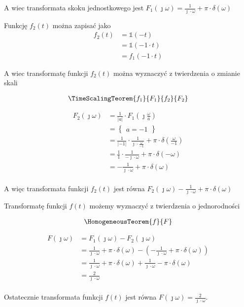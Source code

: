 \begin{task}
A wiec transformata skoku jednostkowego jest $F_1(\jmath \omega)=\frac{1}{\jmath \cdot \omega } + \pi \cdot \delta(\omega)$

Funkcję $f_2(t)$ można zapisać jako
\begin{align*}
f_2(t)&=\mathbb{1}(-t)\\
&=\mathbb{1}(-1 \cdot t)\\
&=f_1(-1 \cdot t)
\end{align*}

A wiec transformatę funkcji $f_2(t)$ można wyznaczyć z twierdzenia o zmianie skali

\begin{align*}
\TimeScalingTeorem{f_1}{F_1}{f_2}{F_2}
\end{align*}

\begin{align*}
F_2(\jmath \omega)&=\frac{1}{\left| a \right|} \cdot F_1(\jmath \frac{\omega}{a})\\
&=\begin{Bmatrix}
a=-1
\end{Bmatrix}\\
&=\frac{1}{\left| -1 \right|} \cdot \frac{1}{\jmath \cdot \frac{\omega}{-1} } + \pi \cdot \delta(\frac{\omega}{-1})\\
&=\frac{1}{1} \cdot \frac{1}{-\jmath \cdot \omega } + \pi \cdot \delta(-\omega)\\
&=- \frac{1}{\jmath \cdot \omega } + \pi \cdot \delta(\omega)\\
\end{align*}

A więc transformata funkcji $f_2(t)$ jest równa $F_2(\jmath \omega)- \frac{1}{\jmath \cdot \omega } + \pi \cdot \delta(\omega)$

Transformatę funkcji $f(t)$ możemy wyznaczyć z twierdzenia o jednorodności 

\begin{align*}
\HomogeneousTeorem{f}{F}
\end{align*}


\begin{align*}
F(\jmath \omega)&=F_1(\jmath \omega) - F_2(\jmath \omega)\\
&=\frac{1}{\jmath \cdot \omega } + \pi \cdot \delta(\omega) - \left(-\frac{1}{\jmath \cdot \omega } + \pi \cdot \delta(\omega)\right)\\
&=\frac{1}{\jmath \cdot \omega } + \pi \cdot \delta(\omega) +\frac{1}{\jmath \cdot \omega } - \pi \cdot \delta(\omega)\\
&=\frac{2}{\jmath \cdot \omega }\\
\end{align*}

Ostatecznie transformata funkcji $f(t)$ jest równa $F(\jmath \omega)=\frac{2}{\jmath \cdot \omega }$.

\end{task}

